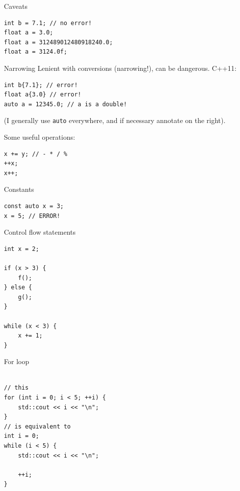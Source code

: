 \documentclass[10pt]{beamer}
\begin{document}
\begin{frame}[fragile,label={sec:org6d660fa}]{Caveats}
 \begin{verbatim}
int b = 7.1; // no error!
float a = 3.0;
float a = 312489012480918240.0;
float a = 3124.0f;
\end{verbatim}
\end{frame}
\begin{frame}[fragile,label={sec:org0709923}]{Narrowing}
 Lenient with conversions (narrowing!), can be dangerous. C++11:
\begin{verbatim}
int b{7.1}; // error!
float a{3.0} // error!
auto a = 12345.0; // a is a double!
\end{verbatim}
(I generally use \texttt{auto} everywhere, and if necessary annotate on the right).

Some useful operations:
\begin{verbatim}
x += y; // - * / %
++x;
x++;
\end{verbatim}
\end{frame}
\begin{frame}[fragile,label={sec:orgbcc8f6e}]{Constants}
 \begin{verbatim}
const auto x = 3;
x = 5; // ERROR!
\end{verbatim}
\end{frame}
\begin{frame}[fragile,label={sec:org0991faf}]{Control flow statements}
 \begin{verbatim}
int x = 2;

if (x > 3) {
    f();
} else {
    g();
}

while (x < 3) {
    x += 1;
}
\end{verbatim}
\end{frame}
\begin{frame}[fragile,label={sec:org6afe87d}]{For loop}
 \begin{verbatim}

// this
for (int i = 0; i < 5; ++i) {
    std::cout << i << "\n";
}
// is equivalent to
int i = 0;
while (i < 5) {
    std::cout << i << "\n";

    ++i;
}
\end{verbatim}
\end{frame}
\end{document}
